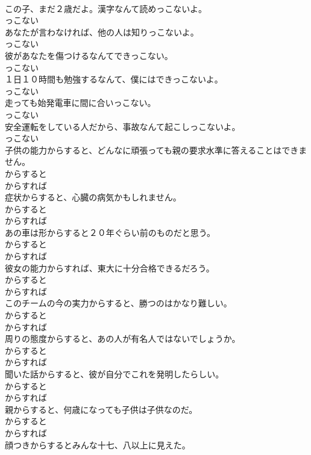 \documentclass[8pt]{extreport}
\begin{document}
\begin{CJK}{UTF8}{min}
\\	この子、まだ２歳だよ。漢字なんて読めっこないよ。	
\\	っこない
\\	あなたが言わなければ、他の人は知りっこないよ。	
\\	っこない
\\	彼があなたを傷つけるなんてできっこない。	
\\	っこない
\\	１日１０時間も勉強するなんて、僕にはできっこないよ。	
\\	っこない
\\	走っても始発電車に間に合いっこない。	
\\	っこない
\\	安全運転をしている人だから、事故なんて起こしっこないよ。	
\\	っこない
\\	子供の能力からすると、どんなに頑張っても親の要求水準に答えることはできません。	
\\	からすると 
\\	からすれば
\\	症状からすると、心臓の病気かもしれません。	
\\	からすると 
\\	からすれば
\\	あの車は形からすると２０年ぐらい前のものだと思う。	
\\	からすると 
\\	からすれば
\\	彼女の能力からすれば、東大に十分合格できるだろう。	
\\	からすると 
\\	からすれば
\\	このチームの今の実力からすると、勝つのはかなり難しい。	
\\	からすると 
\\	からすれば
\\	周りの態度からすると、あの人が有名人ではないでしょうか。	
\\	からすると 
\\	からすれば
\\	聞いた話からすると、彼が自分でこれを発明したらしい。	
\\	からすると 
\\	からすれば
\\	親からすると、何歳になっても子供は子供なのだ。	
\\	からすると 
\\	からすれば
\\	顔つきからするとみんな十七、八以上に見えた。	

\end{CJK}
\end{document}
